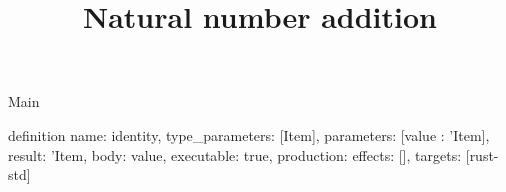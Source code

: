 \begin{lexlean}{Main}
\title{Natural number addition}
\begin{semanticmodule}
definition{
  name: identity,
  type_parameters: [Item],
  parameters: [value : 'Item],
  result: 'Item,
  body: value,
  executable: true,
  production: {effects: [], targets: [rust-std]}
}
\end{semanticmodule}
\end{lexlean}
